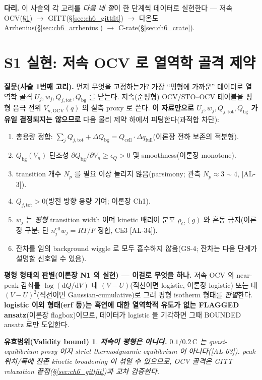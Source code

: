 \documentclass[11pt,a4paper]{article}
\newtheorem*{boundbox}{유효범위(Validity bound)}
\newcommand{\dd}{\mathrm{d}}
\newcommand{\eff}{\mathrm{eff}}
\newcommand{\bg}{\mathrm{bg}}
\newcommand{\cell}{\mathrm{cell}}
\newcommand{\OCV}{\mathrm{OCV}}
\newcommand{\tot}{\mathrm{tot}}
\newcommand{\AL}[1]{\textsf{[AL-#1]}}
\begin{document}
\textbf{다리.} 이 사슬의 각 고리를 \emph{다음 네 절}이 한 단계씩 데이터로 실현한다 — 저속 OCV(\S\ref{sec:ch6_ocvfit})
$\to$ GITT(\S\ref{sec:ch6_gittfit}) $\to$ 다온도 Arrhenius(\S\ref{sec:ch6_arrhenius}) $\to$ C-rate(\S\ref{sec:ch6_crate}).

\section{S1 실현: 저속 OCV 로 열역학 골격 제약}\label{sec:ch6_ocvfit}
\textbf{질문(사슬 1번째 고리).} 먼저 무엇을 고정하는가? 가장 ``평형에 가까운'' 데이터로 열역학 골격
$U_j,w_j,Q_{j,\tot},Q_\bg$ 를 닫는다. 저속(준평형) OCV/STO--OCV 테이블을 평형 음극 전위 $V_{n,\OCV}(q)$ 의 실측
proxy 로 쓴다. \textbf{이 자료만으로 $U_j,w_j,Q_{j,\tot},Q_\bg$ 가 유일 결정되지는 않으므로} 다음 물리 제약 하에서
피팅한다(과적합 차단):
\begin{enumerate}[label=O\arabic*),leftmargin=2.4em]
\item 총용량 정합: $\sum_j Q_{j,\tot}+\Delta Q_\bg=Q_\cell\cdot\Delta q_{\mathrm{full}}$(이론장 전하 보존의 적분형).
\item $Q_\bg(V_n)$ 단조성 $\partial Q_\bg/\partial V_n\ge\epsilon_Q>0$ 및 smoothness(이론장 monotone).
\item transition 개수 $N_p$ 를 필요 이상 늘리지 않음(parsimony; 관측 $N_p\approx3\sim4$, \AL{3}).
\item $Q_{j,\tot}>0$(방전 방향 용량 기여; 이론장 Ch1).
\item $w_j$ 는 \emph{평형} transition width 이며 kinetic 배리어 분포 $\rho_G(g)$ 와 혼동 금지(이론장 구분; 단
  $n_j^{\eff}w_j=RT/F$ 정합, Ch3 \AL{34}).
\item 잔차를 임의 background wiggle 로 모두 흡수하지 않음(GS-4; 잔차는 다음 단계가 설명할 신호일 수 있음).
\end{enumerate}
\textbf{평형 형태의 판별(이론장 N1 의 실현) — 이걸로 무엇을 하나.} 저속 OCV 의 near-peak 감쇠를
$\log(\dd Q/\dd V)$ 대 $(V-U)$(직선이면 logistic, 이론장 logistic) 또는 대 $(V-U)^2$(직선이면 Gaussian-cumulative)로
그려 평형 isotherm 형태를 \emph{판별}한다. \textbf{logistic 이외 형태(erf 등)는 흑연에 대한 열역학적 유도가 없는
FLAGGED ansatz}(이론장 flagbox)이므로, 데이터가 logistic 을 기각하면 그때 BOUNDED ansatz 로만 도입한다.
\begin{boundbox}
\textbf{저속이 평형은 아니다.} $0.1/0.2\,\mathrm C$ 는 \emph{quasi-equilibrium proxy} 이지 strict thermodynamic
equilibrium 이 아니다(\AL{63}). peak 위치/폭에 잔존 kinetic broadening 이 섞일 수 있으므로, OCV 골격은 GITT
relaxation 끝점(\S\ref{sec:ch6_gittfit})과 교차 검증한다.
\end{boundbox}
\end{document}
